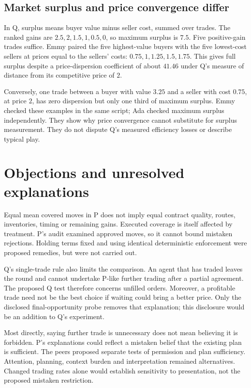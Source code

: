 \documentclass{article}
\begin{document}
\subsection{Market surplus and price convergence differ}
In Q, surplus means buyer value minus seller cost, summed over trades. The ranked gains are
\(2.5,2,1.5,1,0.5,0\), so maximum surplus is \(7.5\). Five positive-gain trades suffice. Emmy paired the five
highest-value buyers with the five lowest-cost sellers at prices equal to the sellers' costs:
\(0.75,1,1.25,1.5,1.75\). This gives full surplus despite a price-dispersion coefficient of about \(41.46\)
under Q's measure of distance from its competitive price of \(2\).

Conversely, one trade between a buyer with value \(3.25\) and a seller with cost \(0.75\), at price \(2\), has
zero dispersion but only one third of maximum surplus. Emmy checked these examples in the same script; Ada
checked maximum surplus independently. They show why price convergence cannot substitute for surplus
measurement. They do not dispute Q's measured efficiency losses or describe typical play.

\section{Objections and unresolved explanations}
Equal mean covered moves in P does not imply equal contract quality, routes, inventories, timing or remaining
gains. Executed coverage is itself affected by treatment. P's audit examined approved moves, so it cannot
bound mistaken rejections. Holding terms fixed and using identical deterministic enforcement were proposed
remedies, but were not carried out.

Q's single-trade rule also limits the comparison. An agent that has traded leaves the round and cannot
undertake P-like further trading after a partial agreement. The proposed Q test therefore concerns unfilled
orders. Moreover, a profitable trade need not be the best choice if waiting could bring a better price. Only
the disclosed final-opportunity probe removes that explanation; this disclosure would be an addition to Q's
experiment.

Most directly, saying further trade is unnecessary does not mean believing it is forbidden. P's explanations
could reflect a mistaken belief that the existing plan is sufficient. The peers proposed separate tests of
permission and plan sufficiency. Attention, planning, context burden and interpretation remained alternatives.
Changed trading rates alone would establish sensitivity to presentation, not the proposed mistaken
restriction.
\end{document}
